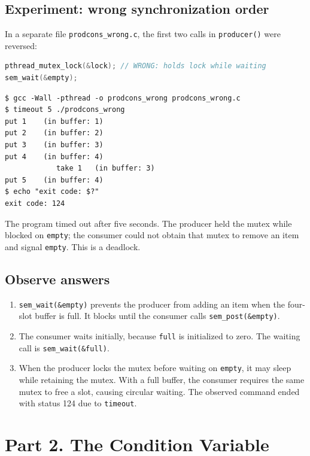 \documentclass[12pt,a4paper]{article}
\begin{document}
\subsection{Experiment: wrong synchronization order}
In a separate file \texttt{prodcons\_wrong.c}, the first two calls in \texttt{producer()} were reversed:
\begin{lstlisting}[language=C]
pthread_mutex_lock(&lock); // WRONG: holds lock while waiting
sem_wait(&empty);
\end{lstlisting}
\begin{lstlisting}
$ gcc -Wall -pthread -o prodcons_wrong prodcons_wrong.c
$ timeout 5 ./prodcons_wrong
put 1    (in buffer: 1)
put 2    (in buffer: 2)
put 3    (in buffer: 3)
put 4    (in buffer: 4)
            take 1   (in buffer: 3)
put 5    (in buffer: 4)
$ echo "exit code: $?"
exit code: 124
\end{lstlisting}
The program timed out after five seconds. The producer held the mutex while blocked on \texttt{empty}; the consumer could not obtain that mutex to remove an item and signal \texttt{empty}. This is a deadlock.

\subsection{Observe answers}
\begin{enumerate}[label=\arabic*.]
\item \texttt{sem\_wait(\&empty)} prevents the producer from adding an item when the four-slot buffer is full. It blocks until the consumer calls \texttt{sem\_post(\&empty)}.
\item The consumer waits initially, because \texttt{full} is initialized to zero. The waiting call is \texttt{sem\_wait(\&full)}.
\item When the producer locks the mutex before waiting on \texttt{empty}, it may sleep while retaining the mutex. With a full buffer, the consumer requires the same mutex to free a slot, causing circular waiting. The observed command ended with status 124 due to \texttt{timeout}.
\end{enumerate}

\section{Part 2. The Condition Variable}
\end{document}
